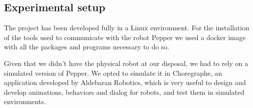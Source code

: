 \documentclass{article}
\begin{document}
\subsection{Experimental setup}
%
%


The project has been developed fully in a Linux environment. For the installation of the tools used to communicate with the robot Pepper we used a docker image with all the packages and programs necessary to do so. 

Given that we didn't have the physical robot at our disposal, we had to rely on a simulated version of Pepper. We opted to simulate it in Choregraphe, an application developed by Aldebaran Robotics, which is very useful to design and develop animations, behaviors and dialog for robots, and test them in simulated environments.
\end{document}
